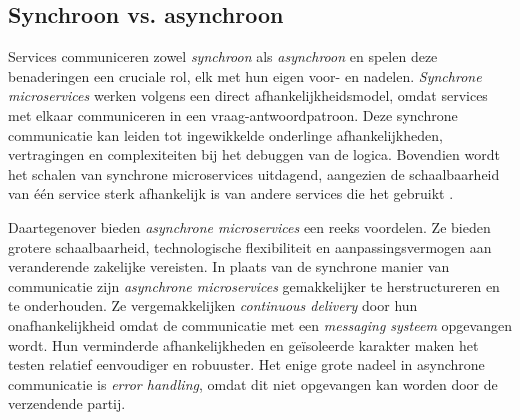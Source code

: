 

 
\subsection{Synchroon vs. asynchroon}
Services communiceren zowel \emph{synchroon} als \emph{asynchroon} en spelen deze benaderingen een cruciale rol, 
elk met hun eigen voor- en nadelen. \emph{Synchrone microservices} werken volgens een direct 
afhankelijkheidsmodel, omdat services met elkaar communiceren in een vraag-antwoordpatroon. 
Deze synchrone communicatie kan leiden tot ingewikkelde onderlinge afhankelijkheden, vertragingen en complexiteiten bij het debuggen 
van de logica. Bovendien wordt het schalen van synchrone microservices uitdagend, 
aangezien de schaalbaarheid van één service sterk afhankelijk is van andere services die het gebruikt \autocite{Bellemare2020}. 
\newline

Daartegenover bieden \emph{asynchrone microservices} een reeks voordelen. Ze bieden grotere schaalbaarheid, technologische 
flexibiliteit en aanpassingsvermogen aan veranderende zakelijke vereisten. 
In plaats van de synchrone manier van communicatie zijn \emph{asynchrone microservices} 
gemakkelijker te herstructureren en te onderhouden. 
Ze vergemakkelijken \emph{continuous delivery} door hun onafhankelijkheid omdat de communicatie 
met een \emph{messaging systeem} opgevangen wordt. Hun verminderde afhankelijkheden en 
geïsoleerde karakter maken het testen relatief eenvoudiger en robuuster.
Het enige grote nadeel in asynchrone communicatie is \emph{error handling}, 
omdat dit niet opgevangen kan worden door de verzendende partij.
\newline

